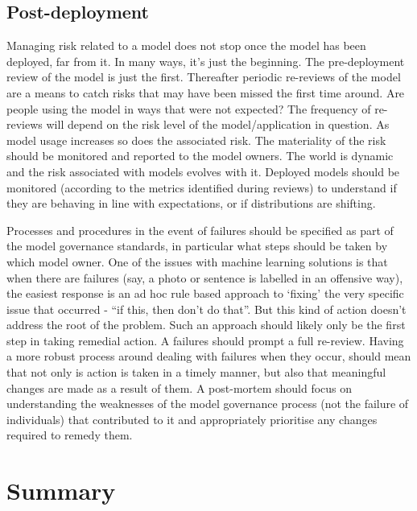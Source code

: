 \subsection{Post-deployment}

Managing risk related to a model does not stop once the model has been deployed, far from it. In many ways, it's just the beginning. The pre-deployment review of the model is just the first. Thereafter periodic re-reviews of the model are a means to catch risks that may have been missed the first time around. Are people using the model in ways that were not expected? The frequency of re-reviews will depend on the risk level of the model/application in question. As model usage increases so does the associated risk. The materiality of the risk should be monitored and reported to the model owners. The world is dynamic and the risk associated with models evolves with it. Deployed models should be monitored (according to the metrics identified during reviews) to understand if they are behaving in line with expectations, or if distributions are shifting.

Processes and procedures in the event of failures should be specified as part of the model governance standards, in particular what steps should be taken by which model owner. One of the issues with machine learning solutions is that when there are failures (say, a photo or sentence is labelled in an offensive way), the easiest response is an ad hoc rule based approach to `fixing' the very specific issue that occurred - ``if this, then don't do that''. But this kind of action doesn't address the root of the problem. Such an approach should likely only be the first step in taking remedial action. A failures should prompt a full re-review. Having a more robust process around dealing with failures when they occur, should mean that not only is action is taken in a timely manner, but also that meaningful changes are made as a result of them. A post-mortem should focus on understanding the weaknesses of the model governance process (not the failure of individuals) that contributed to it and appropriately prioritise any changes required to remedy them.

\section*{Summary}

